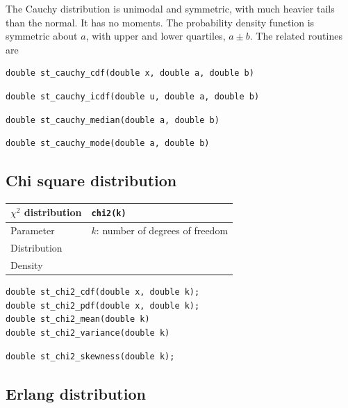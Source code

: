 The Cauchy distribution is unimodal and symmetric, with much heavier
tails than the normal. It has no moments.
The probability density function is symmetric about $a$, with upper
and lower quartiles, $a \pm b$.
The related routines are
\begin{verbatim}
double st_cauchy_cdf(double x, double a, double b)
\end{verbatim}
\begin{verbatim}
double st_cauchy_icdf(double u, double a, double b)
\end{verbatim}
\begin{verbatim}
double st_cauchy_median(double a, double b)
\end{verbatim}
\begin{verbatim}
double st_cauchy_mode(double a, double b)
\end{verbatim}

\subsection{Chi square distribution}
\label{sec:chi2}

\begin{tabularx}{\textwidth}{ll}
$\chi^2$ distribution & \verb|chi2(k)| \\
\hline
Parameter & $k$: number of degrees of freedom \\
Distribution \\
Density \\
\end{tabularx}

\begin{verbatim}
double st_chi2_cdf(double x, double k);
double st_chi2_pdf(double x, double k);
double st_chi2_mean(double k)
double st_chi2_variance(double k)
\end{verbatim}

\begin{verbatim}
double st_chi2_skewness(double k);
\end{verbatim}

\subsection{Erlang distribution}
\label{sec:stat_Erlang}

